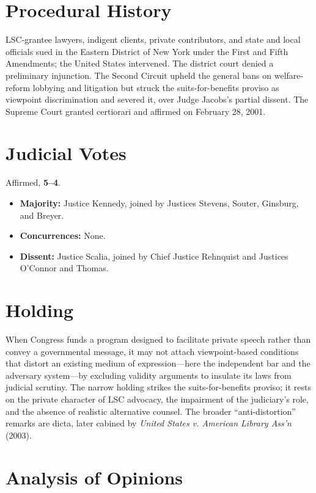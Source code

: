 \documentclass[12pt]{article}
\begin{document}
\section{Procedural History}

LSC-grantee lawyers, indigent clients, private contributors, and state and local officials sued in the Eastern District of New York under the First and Fifth Amendments; the United States intervened. The district court denied a preliminary injunction. The Second Circuit upheld the general bans on welfare-reform lobbying and litigation but struck the suits-for-benefits proviso as viewpoint discrimination and severed it, over Judge Jacobs's partial dissent. The Supreme Court granted certiorari and affirmed on February 28, 2001.

\section{Judicial Votes}

Affirmed, \textbf{5--4}.
\begin{itemize}
\item \textbf{Majority:} Justice Kennedy, joined by Justices Stevens, Souter, Ginsburg, and Breyer.
\item \textbf{Concurrences:} None.
\item \textbf{Dissent:} Justice Scalia, joined by Chief Justice Rehnquist and Justices O'Connor and Thomas.
\end{itemize}

\section{Holding}

When Congress funds a program designed to facilitate private speech rather than convey a governmental message, it may not attach viewpoint-based conditions that distort an existing medium of expression---here the independent bar and the adversary system---by excluding validity arguments to insulate its laws from judicial scrutiny. The narrow holding strikes the suits-for-benefits proviso; it rests on the private character of LSC advocacy, the impairment of the judiciary's role, and the absence of realistic alternative counsel. The broader ``anti-distortion'' remarks are dicta, later cabined by \textit{United States v. American Library Ass'n} (2003).

\section{Analysis of Opinions}
\end{document}
